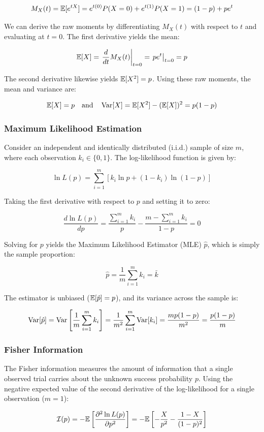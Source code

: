	\[
	M_X(t) = \mathbb{E}[e^{tX}] = e^{t(0)}P(X=0) + e^{t(1)}P(X=1) = (1-p) + pe^t
	\]
	
We can derive the raw moments by differentiating $M_X(t)$ with respect to $t$ and evaluating at $t = 0$. The first derivative yields the mean:

	\[
	\mathbb{E}[X] = \left. \frac{d}{dt} M_X(t) \right|_{t=0} = \left. pe^t \right|_{t=0} = p
	\]
	
The second derivative likewise yields $\mathbb{E}[X^2] = p$. Using these raw moments, the mean and variance are:

	\[
	\mathbb{E}[X] = p \quad \text{and} \quad \operatorname{Var}[X] = \mathbb{E}[X^2] - (\mathbb{E}[X])^2 = p(1-p)
	\]

\subsubsection{Maximum Likelihood Estimation}
Consider an independent and identically distributed (i.i.d.) sample of size $m$, where each observation $k_i \in \{0, 1\}$. The log-likelihood function is given by:

	\[
	\ln L(p) = \sum_{i=1}^m \left[ k_i \ln p + (1-k_i) \ln(1-p) \right]
	\]
	
Taking the first derivative with respect to $p$ and setting it to zero:

	\[
	\frac{d\ln L(p)}{dp} = \frac{\sum_{i=1}^m k_i}{p} - \frac{m - \sum_{i=1}^m k_i}{1-p} = 0
	\]
	
Solving for $p$ yields the Maximum Likelihood Estimator (MLE) $\hat{p}$, which is simply the sample proportion:

	\[
	\hat{p} = \frac{1}{m} \sum_{i=1}^m k_i = \bar{k}
	\]
	
The estimator is unbiased ($\mathbb{E}[\hat{p}] = p$), and its variance across the sample is:

	\[
	\operatorname{Var}[\hat{p}] = \operatorname{Var}\left[\frac{1}{m} \sum_{i=1}^m k_i\right] = \frac{1}{m^2} \sum_{i=1}^m \operatorname{Var}[k_i] = \frac{mp(1-p)}{m^2} = \frac{p(1-p)}{m}
	\]

\subsubsection{Fisher Information}
The Fisher information measures the amount of information that a single observed trial carries about the unknown success probability $p$. Using the negative expected value of the second derivative of the log-likelihood for a single observation ($m=1$):

	\[
	\mathcal{I}(p) = -\mathbb{E}\left[ \frac{\partial^2 \ln L(p)}{\partial p^2} \right] = -\mathbb{E}\left[ -\frac{X}{p^2} - \frac{1-X}{(1-p)^2} \right]
	\]

